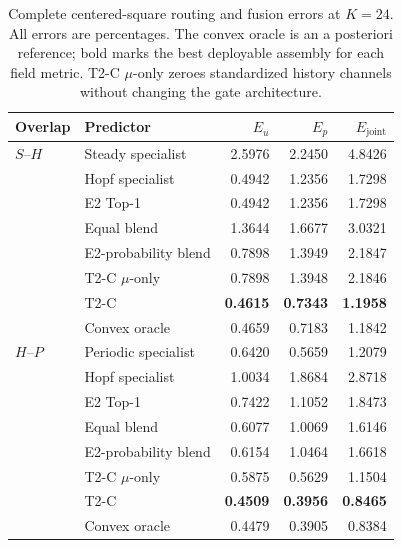 \begin{table}[!htbp]
\centering
\caption{Complete centered-square routing and fusion errors at $K=24$.
All errors are percentages. The convex oracle is an a posteriori reference;
bold marks the best deployable assembly for each field metric.
T2-C $\mu$-only zeroes standardized history channels without changing the gate architecture.}
\label{tab:square_fusion_full}
\small
\setlength{\tabcolsep}{5pt}
\begin{tabular}{@{}llrrr@{}}
\toprule
Overlap & Predictor & $E_u$ & $E_p$ & $E_{\mathrm{joint}}$ \\
\midrule
$S$--$H$ & Steady specialist & 2.5976 & 2.2450 & 4.8426 \\
 & Hopf specialist & 0.4942 & 1.2356 & 1.7298 \\
 & E2 Top-1 & 0.4942 & 1.2356 & 1.7298 \\
 & Equal blend & 1.3644 & 1.6677 & 3.0321 \\
 & E2-probability blend & 0.7898 & 1.3949 & 2.1847 \\
 & T2-C $\mu$-only & 0.7898 & 1.3948 & 2.1846 \\
 & T2-C & \textbf{0.4615} & \textbf{0.7343} & \textbf{1.1958} \\
 & Convex oracle & 0.4659 & 0.7183 & 1.1842 \\
\midrule
$H$--$P$ & Periodic specialist & 0.6420 & 0.5659 & 1.2079 \\
 & Hopf specialist & 1.0034 & 1.8684 & 2.8718 \\
 & E2 Top-1 & 0.7422 & 1.1052 & 1.8473 \\
 & Equal blend & 0.6077 & 1.0069 & 1.6146 \\
 & E2-probability blend & 0.6154 & 1.0464 & 1.6618 \\
 & T2-C $\mu$-only & 0.5875 & 0.5629 & 1.1504 \\
 & T2-C & \textbf{0.4509} & \textbf{0.3956} & \textbf{0.8465} \\
 & Convex oracle & 0.4479 & 0.3905 & 0.8384 \\
\bottomrule
\end{tabular}
\end{table}

